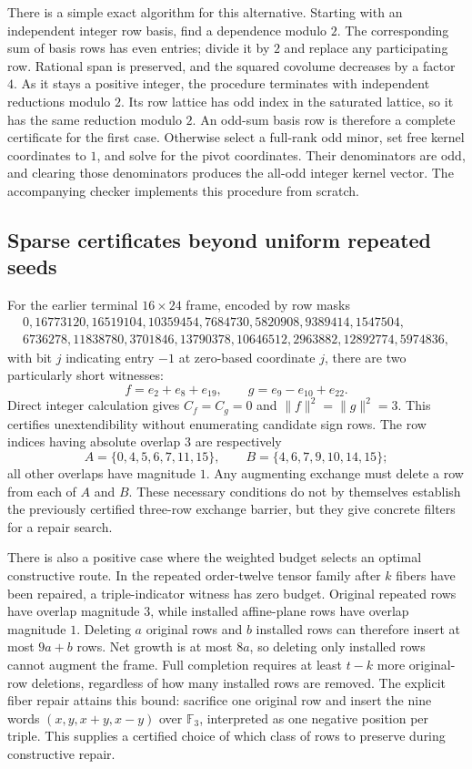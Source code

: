 There is a simple exact algorithm for this alternative. Starting with
an independent integer row basis, find a dependence modulo $2$.
The corresponding sum of basis rows has even entries; divide it by
$2$ and replace any participating row. Rational span is preserved,
and the squared covolume decreases by a factor $4$. As it stays a
positive integer, the procedure terminates with independent reductions
modulo $2$. Its row lattice has odd index in the saturated lattice,
so it has the same reduction modulo $2$. An odd-sum basis row is
therefore a complete certificate for the first case. Otherwise select
a full-rank odd minor, set free kernel coordinates to $1$, and solve
for the pivot coordinates. Their denominators are odd, and clearing
those denominators produces the all-odd integer kernel vector.
The accompanying checker implements this procedure from scratch.

\subsection{Sparse certificates beyond uniform repeated seeds}
For the earlier terminal $16\times24$ frame, encoded by row masks
\[
\begin{gathered}
0,16773120,16519104,10359454,7684730,5820908,9389414,1547504,\\
6736278,11838780,3701846,13790378,10646512,2963882,12892774,5974836,
\end{gathered}
\]
with bit $j$ indicating entry $-1$ at zero-based coordinate $j$,
there are two particularly short witnesses:
\[
 f=e_2+e_8+e_{19},\qquad g=e_9-e_{10}+e_{22}.
\]
Direct integer calculation gives $C_f=C_g=0$ and
$\|f\|^2=\|g\|^2=3$. This certifies unextendibility without
enumerating candidate sign rows. The row indices having absolute
overlap $3$ are respectively
\[
 A=\{0,4,5,6,7,11,15\},\qquad
 B=\{4,6,7,9,10,14,15\};
\]
all other overlaps have magnitude $1$. Any augmenting exchange must
delete a row from each of $A$ and $B$. These necessary conditions
do not by themselves establish the previously certified three-row
exchange barrier, but they give concrete filters for a repair search.

There is also a positive case where the weighted budget selects an
optimal constructive route. In the repeated order-twelve tensor
family after $k$ fibers have been repaired, a triple-indicator
witness has zero budget. Original repeated rows have overlap
magnitude $3$, while installed affine-plane rows have overlap
magnitude $1$. Deleting $a$ original rows and $b$ installed rows
can therefore insert at most $9a+b$ rows. Net growth is at most
$8a$, so deleting only installed rows cannot augment the frame.
Full completion requires at least $t-k$ more original-row deletions,
regardless of how many installed rows are removed. The explicit fiber
repair attains this bound: sacrifice one original row and insert the
nine words $(x,y,x+y,x-y)$ over $\mathbb F_3$, interpreted as one
negative position per triple. This supplies a certified choice of
which class of rows to preserve during constructive repair.


